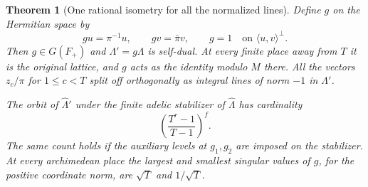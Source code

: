 \documentclass[a4paper,11pt]{article}
\newtheorem{theorem}[proposition]{Theorem}
\theoremstyle{definition}
\theoremstyle{remark}
\numberwithin{equation}{section}
\begin{document}
\begin{theorem}[One rational isometry for all the normalized lines]
\label{thm:neighbour93}
Define \(g\) on the Hermitian space by
\[
          gu=\pi^{-1}u,\qquad gv=\bar\pi v,\qquad
          g=1\quad\text{on }\langle u,v\rangle^\perp .
\]
Then \(g\in G(F_+)\) and \(\Lambda'=g\Lambda\) is self-dual.
At every finite place away from \(T\) it is the original lattice,
and \(g\) acts as the identity modulo \(M\) there. All the vectors
\(z_c/\pi\) for \(1\le c<T\) split off orthogonally as integral
lines of norm \(-1\) in \(\Lambda'\).

The orbit of \(\widehat{\Lambda}'\) under the finite adelic
stabilizer of \(\widehat\Lambda\) has cardinality
\begin{equation}
                \left(\frac{T^r-1}{T-1}\right)^f .           \label{eq:orbit93}
\end{equation}
The same count holds if the auxiliary levels at \(g_1,g_2\)
are imposed on the stabilizer. At every archimedean place the
largest and smallest singular values of \(g\), for the positive
coordinate norm, are \(\sqrt T\) and \(1/\sqrt T\).
\end{theorem}
\end{document}
